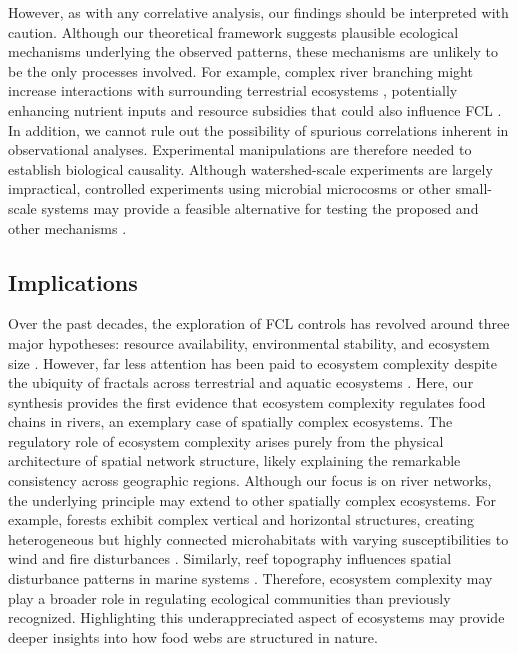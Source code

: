 \documentclass[11pt, class=article, crop=false]{standalone}
\theoremstyle{definition}
\begin{document}
However, as with any correlative analysis, our findings should be interpreted with caution. Although our theoretical framework suggests plausible ecological mechanisms underlying the observed patterns, these mechanisms are unlikely to be the only processes involved.
For example, complex river branching might increase interactions with surrounding terrestrial ecosystems \citep{gomi_understanding_2002}, potentially enhancing nutrient inputs and resource subsidies that could also influence FCL \citep{terui_stream_2018}.
In addition, we cannot rule out the possibility of spurious correlations inherent in observational analyses. 
Experimental manipulations are therefore needed to establish biological causality. 
Although watershed-scale experiments are largely impractical, controlled experiments using microbial microcosms or other small-scale systems may provide a feasible alternative for testing the proposed and other mechanisms \citep{altermatt_big_2015, green_long_2023}.

\subsection{Implications}

Over the past decades, the exploration of FCL controls has revolved around three major hypotheses: resource availability, environmental stability, and ecosystem size \citep{oksanen_exploitation_1981, pimm_number_1977, schoener_food_1989}.
However, far less attention has been paid to ecosystem complexity despite the ubiquity of fractals across terrestrial \citep{turner_landscape_2015} and aquatic ecosystems \citep{rodriguez-iturbe_fractal_2001}.
Here, our synthesis provides the first evidence that ecosystem complexity regulates food chains in rivers, an exemplary case of spatially complex ecosystems.
The regulatory role of ecosystem complexity arises purely from the physical architecture of spatial network structure, likely explaining the remarkable consistency across geographic regions.
Although our focus is on river networks, the underlying principle may extend to other spatially complex ecosystems.
For example, forests exhibit complex vertical and horizontal structures, creating heterogeneous but highly connected microhabitats with varying susceptibilities to wind and fire disturbances \citep{peterson_contagious_2002, cansler_climate_2014}.
Similarly, reef topography influences spatial disturbance patterns in marine systems \citep{connell_30year_1997}.
Therefore, ecosystem complexity may play a broader role in regulating ecological communities than previously recognized.
Highlighting this underappreciated aspect of ecosystems may provide deeper insights into how food webs are structured in nature.
\end{document}
